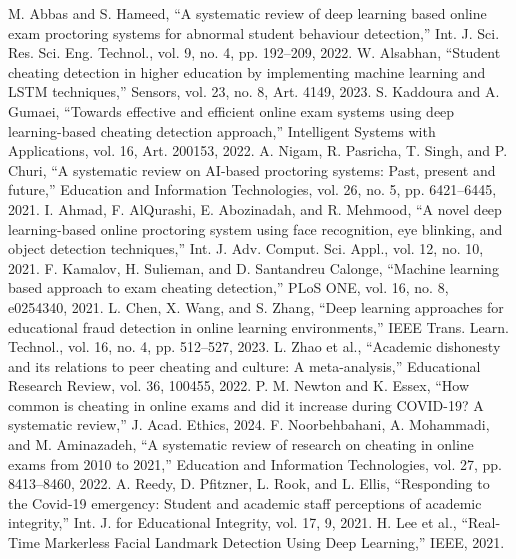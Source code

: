 \documentclass[conference]{IEEEtran}
\begin{document}
\begin{thebibliography}{23}
 M. Abbas and S. Hameed, ``A systematic review of deep learning based online exam proctoring systems for abnormal student behaviour detection,'' Int. J. Sci. Res. Sci. Eng. Technol., vol. 9, no. 4, pp. 192--209, 2022.
 W. Alsabhan, ``Student cheating detection in higher education by implementing machine learning and LSTM techniques,'' Sensors, vol. 23, no. 8, Art. 4149, 2023.
 S. Kaddoura and A. Gumaei, ``Towards effective and efficient online exam systems using deep learning-based cheating detection approach,'' Intelligent Systems with Applications, vol. 16, Art. 200153, 2022.
 A. Nigam, R. Pasricha, T. Singh, and P. Churi, ``A systematic review on AI-based proctoring systems: Past, present and future,'' Education and Information Technologies, vol. 26, no. 5, pp. 6421--6445, 2021.
 I. Ahmad, F. AlQurashi, E. Abozinadah, and R. Mehmood, ``A novel deep learning-based online proctoring system using face recognition, eye blinking, and object detection techniques,'' Int. J. Adv. Comput. Sci. Appl., vol. 12, no. 10, 2021.
 F. Kamalov, H. Sulieman, and D. Santandreu Calonge, ``Machine learning based approach to exam cheating detection,'' PLoS ONE, vol. 16, no. 8, e0254340, 2021.
 L. Chen, X. Wang, and S. Zhang, ``Deep learning approaches for educational fraud detection in online learning environments,'' IEEE Trans. Learn. Technol., vol. 16, no. 4, pp. 512--527, 2023.
 L. Zhao et al., ``Academic dishonesty and its relations to peer cheating and culture: A meta-analysis,'' Educational Research Review, vol. 36, 100455, 2022.
 P. M. Newton and K. Essex, ``How common is cheating in online exams and did it increase during COVID-19? A systematic review,'' J. Acad. Ethics, 2024.
 F. Noorbehbahani, A. Mohammadi, and M. Aminazadeh, ``A systematic review of research on cheating in online exams from 2010 to 2021,'' Education and Information Technologies, vol. 27, pp. 8413–8460, 2022.
 A. Reedy, D. Pfitzner, L. Rook, and L. Ellis, ``Responding to the Covid-19 emergency: Student and academic staff perceptions of academic integrity,'' Int. J. for Educational Integrity, vol. 17, 9, 2021.
 H. Lee et al., ``Real-Time Markerless Facial Landmark Detection Using Deep Learning,'' IEEE, 2021.

\end{thebibliography}
\end{document}
